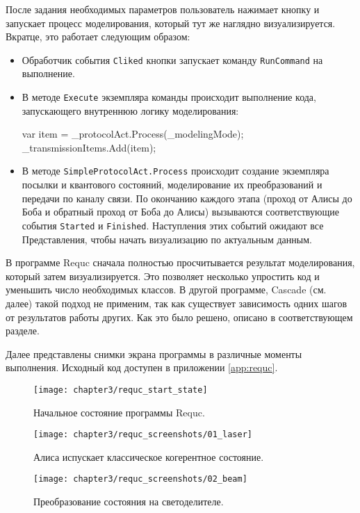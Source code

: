После задания необходимых параметров пользователь нажимает кнопку и запускает процесс моделирования, который тут же наглядно визуализируется. 
Вкратце, это работает следующим образом:
\begin{itemize}
  \item Обработчик события \texttt{Cliked} кнопки запускает команду \texttt{RunCommand} на выполнение.
  \item В методе \texttt{Execute} экземпляра команды происходит выполнение кода, запускающего внутреннюю логику моделирования:
    \begin{csharpcode}
      var item = _protocolAct.Process(_modelingMode);
      _transmissionItems.Add(item);
    \end{csharpcode}
  \item В методе \texttt{SimpleProtocolAct.Process} происходит создание экземпляра посылки и квантового состояний, моделирование их преобразований и передачи по каналу связи. По окончанию каждого этапа (проход от Алисы до Боба и обратный проход от Боба до Алисы) вызываются соответствующие события \texttt{Started} и \texttt{Finished}. Наступления этих событий ожидают все Представления, чтобы начать визуализацию по актуальным данным.
\end{itemize}

В программе Requc сначала полностью просчитывается результат моделирования, который затем визуализируется. Это позволяет несколько упростить код и уменьшить число необходимых классов. В другой программе, Cascade (см. далее) такой подход не применим, так как существует зависимость одних шагов от результатов работы других. Как это было решено, описано в соответствующем разделе.

Далее представлены снимки экрана программы в различные моменты выполнения. Исходный код доступен в приложении \ref{app:requc}.
\clearpage
\begin{figure}[h]
  \texttt{[image: chapter3/requc\_start\_state]}
  \caption{Начальное состояние программы Requc.}
  \label{fig:requc_start_state}
\end{figure}

\begin{figure}[h]
  \texttt{[image: chapter3/requc\_screenshots/01\_laser]}
  \caption{Алиса испускает классическое когерентное состояние.}
\end{figure}

\begin{figure}[h]
  \texttt{[image: chapter3/requc\_screenshots/02\_beam]}
  \caption{Преобразование состояния на светоделителе.}
\end{figure}

